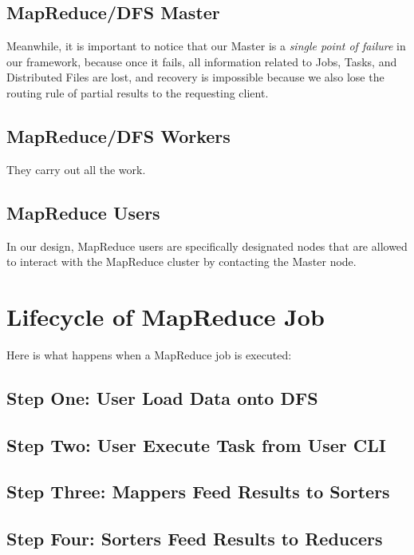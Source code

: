 \documentclass{article} %
\begin{document}
\subsection{MapReduce/DFS Master}

\par

\par Meanwhile, it is important to notice that our Master is a \emph{single point of failure} in our framework, because once it fails, all information related to Jobs, Tasks, and Distributed Files are lost, and recovery is impossible because we also lose the routing rule of partial results to the requesting client.

\subsection{MapReduce/DFS Workers}

\par\qquad They carry out all the work.

\subsection{MapReduce Users}

\par\qquad In our design, MapReduce users are specifically designated nodes that are allowed to interact with the MapReduce cluster by contacting the Master node. 

\section{Lifecycle of MapReduce Job}
Here is what happens when a MapReduce job is executed:
\subsection*{Step One: User Load Data onto DFS}
\subsection*{Step Two: User Execute Task from User CLI}
\subsection*{Step Three: Mappers Feed Results to Sorters}
\subsection*{Step Four: Sorters Feed Results to Reducers}
\end{document}
